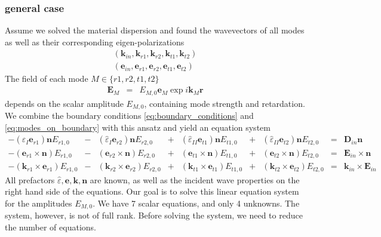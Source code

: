\documentclass[12pt,a4paper,twoside,openright,BCOR10mm,headsepline,titlepage,abstracton,chapterprefix,final]{scrreprt}
\newcommand\Vector[1]{{\mathbf{#1}}}
\newcommand\Location{\Vector{r}}
\newcommand\wavenumber{k}
\newcommand\Wavevector{\Vector{\wavenumber}}
\newcommand\Tensor[1]{\hat{#1}}
\newcommand\scalarEfield{E}
\newcommand\scalarDfield{D}
\newcommand\Efield{\Vector{\scalarEfield}}
\newcommand\Dfield{\Vector{\scalarDfield}}
\newcommand\permittivity{\Tensor{\scalarpermittivity}}
\newcommand\scalarpermittivity{\varepsilon}
\newcommand\materialone{I}
\newcommand\materialtwo{{II}}
\begin{document}
\subsubsection{general case}
Assume we solved the material dispersion and found the wavevectors of all modes as well as their corresponding eigen-polarizations
\begin{subequations}
\begin{eqnarray}
(\Wavevector_{in}, \Wavevector_{r1}, \Wavevector_{r2}, \Wavevector_{t1}, \Wavevector_{t2}) \\
(\Vector{e}_{in}, \Vector{e}_{r1}, \Vector{e}_{r2}, \Vector{e}_{t1}, \Vector{e}_{t2})
\end{eqnarray}
\end{subequations}
The field of each mode $M \in \{ r1, r2, t1, t2 \}$
\begin{eqnarray}
\Efield_{M} &=& E_{M,0} \Vector{e}_{M} \exp{i \Wavevector_M \Location}
\end{eqnarray}
depends on the scalar amplitude $E_{M,0}$, containing mode strength and retardation.
We combine the boundary conditions \ref{eq:boundary_conditions} and \ref{eq:modes_on_boundary} with this ansatz and yield an equation system
\begingroup \small
\begin{subequations}
\begin{align}
   - ( \permittivity_\materialone \Vector{e}_{r1}) \Vector{n} E_{r1,0} &-& ( \permittivity_\materialone \Vector{e}_{r2}) \Vector{n} E_{r2,0} &+& ( \permittivity_\materialtwo \Vector{e}_{t1} ) \Vector{n} E_{t1,0} &+& ( \permittivity_\materialtwo \Vector{e}_{t2} ) \Vector{n} E_{t2,0} &=& \Dfield_{in} \Vector{n} \label{eq:fresneldn}\\
   - ( \Vector{e}_{r1} \times \Vector{n} )         E_{r1,0} &-& ( \Vector{e}_{r2} \times \Vector{n} )         E_{r2,0} &+& ( \Vector{e}_{t1} \times \Vector{n} )          E_{t1,0} &+& ( \Vector{e}_{t2} \times \Vector{n} )          E_{t2,0} &=& \Efield_{in} \times \Vector{n} \label{eq:fresnelEcrossn} \\
   - ( \Wavevector_{r1} \times \Vector{e}_{r1} )   E_{r1,0} &-& ( \Wavevector_{r2} \times \Vector{e}_{r2} )   E_{r2,0} &+& ( \Wavevector_{t1} \times \Vector{e}_{t1} )    E_{t1,0} &+& ( \Wavevector_{t2} \times \Vector{e}_{t2} )    E_{t2,0} &=& \Wavevector_{in} \times \Efield_{in} \label{eq:fresnelkE}
\end{align}
\end{subequations}
\endgroup
All prefactors $\permittivity, \Vector{e}, \Wavevector, \Vector{n}$ are known, 
as well as the incident wave properties on the right hand side of the equations.
Our goal is to solve this linear equation system for the amplitudes $E_{M,0}$.
We have 7 scalar equations, and only 4 unknowns.
The system, however, is not of full rank.
Before solving the system, we need to reduce the number of equations.
\end{document}
